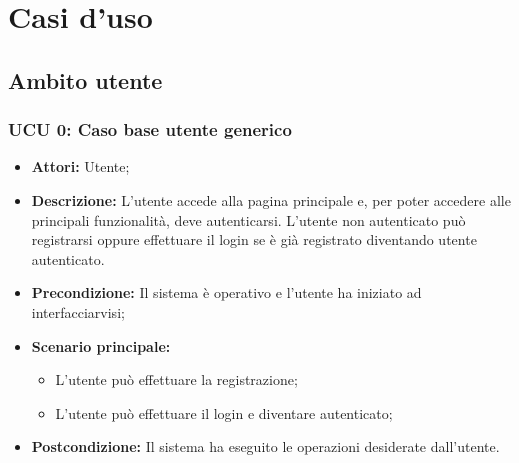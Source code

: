 \section{Casi d'uso}

\subsection{Ambito utente}

\hypertarget{U0}{}
\subsubsection{UCU 0: Caso base utente generico}
\begin{itemize}
\item \textbf{Attori:} Utente;
\item \textbf{Descrizione:} L'utente accede alla pagina principale e, per poter accedere alle principali funzionalità, deve autenticarsi.
L'utente non autenticato può registrarsi oppure effettuare il login se è già registrato diventando utente autenticato.
\item \textbf{Precondizione:} Il sistema è operativo e l'utente ha iniziato ad interfacciarvisi;
\item \textbf{Scenario principale:}
\begin{itemize}
\item L'utente può effettuare la registrazione;
\item L'utente può effettuare il login e diventare autenticato;
\end{itemize}
\item \textbf{Postcondizione:} Il sistema ha eseguito le operazioni desiderate dall'utente.
\end{itemize}

\hypertarget{U1}{}
